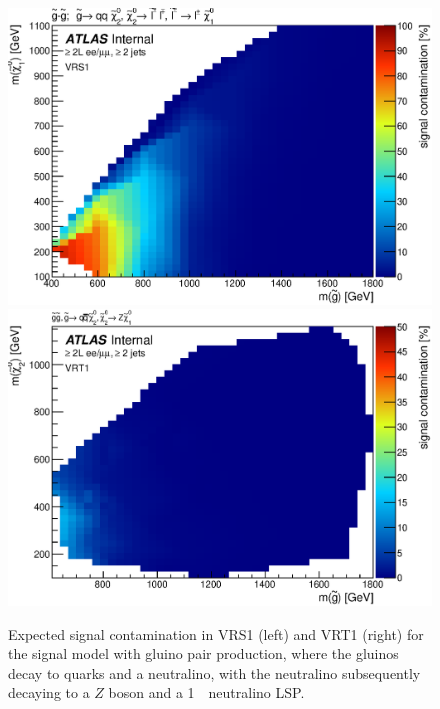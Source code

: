 \begin{figure}[ht]
\centering
\includegraphics[width=.48\textwidth]{figures/signalacceptcontam/cont_SM_GG_N2_1_VRS1.eps}
\includegraphics[width=.48\textwidth]{figures/signalacceptcontam/cont_SM_GG_N2_1_VRT1.eps}
\caption{
Expected signal contamination in VRS1 (left) and VRT1 (right) for the signal model with gluino pair production, where the gluinos decay to quarks and a neutralino, 
with the neutralino subsequently decaying to a $Z$ boson and a 1~\GeV\ neutralino LSP.}
\label{fig:sig_contam_VR}
\end{figure}

